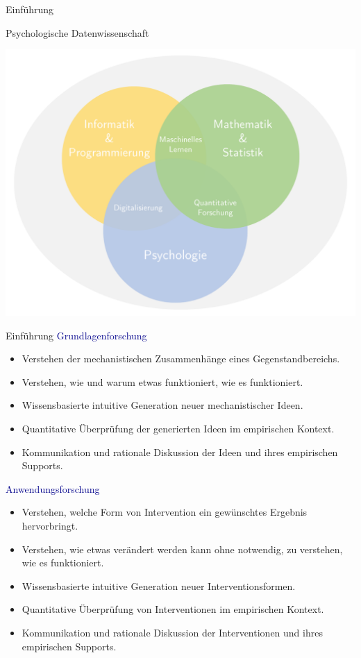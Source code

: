 \documentclass[
  8pt,
  ignorenonframetext,
]{beamer}
\providecommand{\tightlist}{%
  \setlength{\itemsep}{0pt}\setlength{\parskip}{0pt}}
\begin{document}
\begin{frame}{Einführung}
\protect\hypertarget{einfuxfchrung-2}{}
\large

Psychologische Datenwissenschaft

\begin{center}\includegraphics[width=0.8\linewidth]{2_Abbildungen/pfm_2_psychologische_datenwissenschaft} \end{center}
\end{frame}

\begin{frame}{Einführung}
\protect\hypertarget{einfuxfchrung-3}{}
\textcolor{darkblue}{Grundlagenforschung}  \small

\begin{itemize}
\tightlist
\item
  Verstehen der mechanistischen Zusammenhänge eines Gegenstandbereichs.
\item
  Verstehen, wie und warum etwas funktioniert, wie es funktioniert.
\item
  Wissensbasierte intuitive Generation neuer mechanistischer Ideen.
\item
  Quantitative Überprüfung der generierten Ideen im empirischen Kontext.
\item
  Kommunikation und rationale Diskussion der Ideen und ihres empirischen
  Supports.
\end{itemize}

\normalsize

\textcolor{darkblue}{Anwendungsforschung} \small

\begin{itemize}
\tightlist
\item
  Verstehen, welche Form von Intervention ein gewünschtes Ergebnis
  hervorbringt.
\item
  Verstehen, wie etwas verändert werden kann ohne notwendig, zu
  verstehen, wie es funktioniert.
\item
  Wissensbasierte intuitive Generation neuer Interventionsformen.
\item
  Quantitative Überprüfung von Interventionen im empirischen Kontext.
\item
  Kommunikation und rationale Diskussion der Interventionen und ihres
  empirischen Supports.
\end{itemize}
\end{frame}
\end{document}
